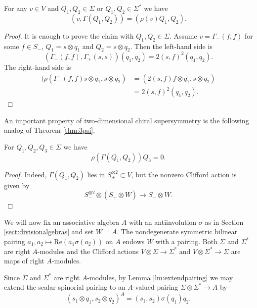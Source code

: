 \documentclass[10pt, oneside]{article}
\renewcommand{\Re}{\mathrm{Re}}
\begin{document}
\begin{prop}
For any $v\in V$ and $Q_1, Q_2\in\Sigma$ or $Q_1, Q_2\in\Sigma^*$ we have
\[(v, \Gamma(Q_1, Q_2)) = (\rho(v) Q_1, Q_2).\]
\end{prop}
\begin{proof}
It is enough to prove the claim with $Q_1, Q_2\in\Sigma$. Assume $v = \Gamma_-(f, f)$ for some $f\in S_-$, $Q_1 = s\otimes q_1$ and $Q_2 = s\otimes q_2$. Then the left-hand side is
\[(\Gamma_-(f, f), \Gamma_+(s, s)) (q_1, q_2) = 2(s, f)^2 (q_1, q_2).\]
The right-hand side is
\begin{align*}
(\rho(\Gamma_-(f, f) s\otimes q_1, s\otimes q_2) &= (2(s, f) f\otimes q_1, s\otimes q_2) \\
&= 2(s, f)^2 (q_1, q_2).
\end{align*}
\end{proof}

An important property of two-dimensional chiral supersymmetry is the following analog of Theorem \ref{thm:3psi}.

\begin{thm}
For $Q_1, Q_2, Q_3\in\Sigma$ we have
\[\rho(\Gamma(Q_1, Q_2))Q_3 = 0.\]
\label{thm:2d3psi}
\end{thm}
\begin{proof}
Indeed, $\Gamma(Q_1, Q_2)$ lies in $S_+^{\otimes 2}\subset V$, but the nonzero Clifford action is given by
\[S_-^{\otimes 2}\otimes (S_+\otimes W)\longrightarrow S_-\otimes W.\]
\end{proof}

We will now fix an associative algebra $A$ with an antiinvolution $\sigma$ as in Section \ref{sect:divisionalgebras} and set $W = A$. The nondegenerate symmetric bilinear pairing $a_1, a_2\mapsto \Re(a_1\sigma(a_2))$ on $A$ endows $W$ with a pairing. Both $\Sigma$ and $\Sigma^*$ are right $A$-modules and the Clifford actions $V\otimes \Sigma\rightarrow \Sigma^*$ and $V\otimes \Sigma^*\rightarrow \Sigma$ are maps of right $A$-modules.

Since $\Sigma$ and $\Sigma^*$ are right $A$-modules, by Lemma \ref{lm:extendpairing} we may extend the scalar spinorial pairing to an $A$-valued pairing $\Sigma\otimes \Sigma^*\rightarrow A$ by
\[(s_1\otimes q_1, s_2\otimes q_2)^A = (s_1, s_2)\sigma(q_1) q_2.\]
\end{document}
